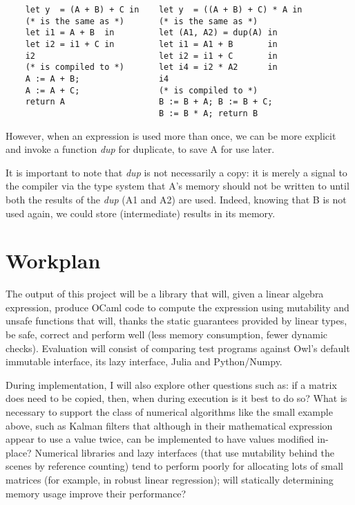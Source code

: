 \documentclass[11pt]{article}
\newcommand{\guidance}[1]{\textsl{\textcolor{Gray}{#1}}}
\begin{document}
\begin{verbatim}
    let y  = (A + B) + C in    let y  = ((A + B) + C) * A in
    (* is the same as *)       (* is the same as *)
    let i1 = A + B  in         let (A1, A2) = dup(A) in
    let i2 = i1 + C in         let i1 = A1 + B       in
    i2                         let i2 = i1 + C       in
    (* is compiled to *)       let i4 = i2 * A2      in
    A := A + B;                i4
    A := A + C;                (* is compiled to *)
    return A                   B := B + A; B := B + C;
                               B := B * A; return B
\end{verbatim}

However, when an expression is used more than once, we can be more explicit and
invoke a function \emph{dup} for duplicate, to save A for use later.

It is important to note that \emph{dup} is not necessarily a copy: it is merely
a signal to the compiler via the type system that A's memory should not be
written to until both the results of the \emph{dup} (A1 and A2) are used.
Indeed, knowing that B is not used again, we could store (intermediate) results
in its memory.

\section{Workplan}

The output of this project will be a library that will, given a linear algebra
expression, produce OCaml code to compute the expression using mutability and
unsafe functions that will, thanks the static guarantees provided by linear
types, be safe, correct and perform well (less memory consumption, fewer
dynamic checks). Evaluation will consist of comparing test programs against
Owl's default immutable interface, its lazy interface, Julia and Python/Numpy.

During implementation, I will also explore other questions such as: if a matrix
does need to be copied, then, when during execution is it best to do so?  What
is necessary to support the class of numerical algorithms like the small
example above, such as Kalman filters that although in their mathematical
expression appear to use a value twice, can be implemented to have values
modified in-place? Numerical libraries and lazy interfaces (that use mutability
behind the scenes by reference counting) tend to perform poorly for allocating
lots of small matrices (for example, in robust linear regression); will
statically determining memory usage improve their performance?
\end{document}
